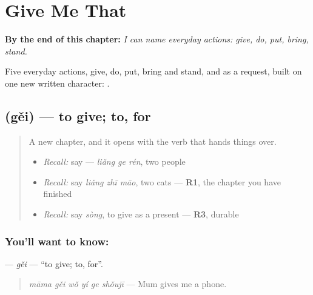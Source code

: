 
\chapter{Give Me That}
\label{ch:zh-give-me-that}

\begin{chapteropening}
\textbf{By the end of this chapter:} \emph{I can name everyday actions: give, do, put, bring, stand.}

Five everyday actions, give, do, put, bring and stand, and  as a request, built on one new written character: .
\end{chapteropening}

\section[\texorpdfstring{\zh{给} (gěi)}{给 (gěi)}]{ (gěi) — to give; to, for}

\label{lesson:ZH-C89-gei}



\begin{quote}
A new chapter, and it opens with the verb that hands things over.

\begin{itemize}
\raggedright
  \item \emph{Recall:} say  — \emph{liǎng ge rén}, two people
  \item \emph{Recall:} say \emph{liǎng zhī māo}, two cats — \textbf{R1}, the chapter you have finished
  \item \emph{Recall:} say \emph{sòng}, to give as a present — \textbf{R3}, durable
\end{itemize}
\end{quote}

\subsection*{You'll want to know: }
\textbf{} — \emph{gěi} — \textquotedblleft{}to give; to, for\textquotedblright{}.

\begin{quote}
\textbf{} \emph{māma gěi wǒ yí ge shǒujī} — Mum gives me a phone.
\end{quote}

